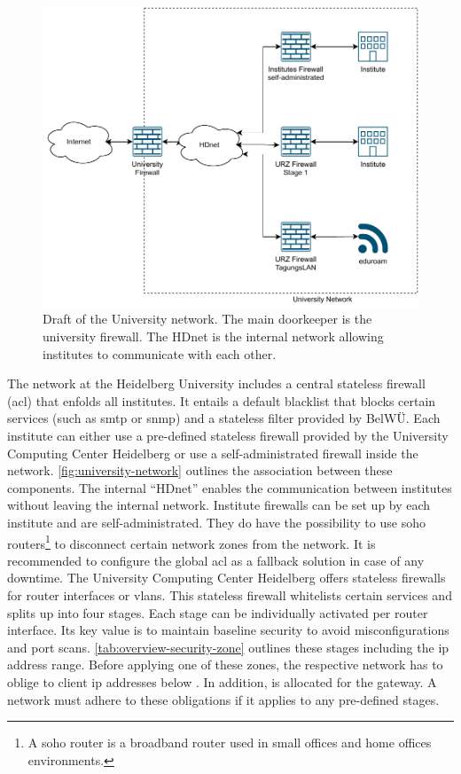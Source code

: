 \begin{figure}[htbp]
    \centering
    \includegraphics[width=\textwidth]{figures/university-network.pdf}
    \caption[Draft of the University network]{
        Draft of the University network.
        The main doorkeeper is the university firewall.
        The HDnet is the internal network allowing institutes to communicate with each other.
    }
    \label{fig:university-network}
\end{figure}

The network at the Heidelberg University includes a central stateless firewall (\ac{acl}) that enfolds all institutes.
It entails a default blacklist that blocks certain services (such as \ac{smtp} or \ac{snmp}) and a stateless filter provided by BelWÜ.
Each institute can either use a pre-defined stateless firewall provided by the University Computing Center Heidelberg or use a self-administrated firewall inside the network.
\autoref{fig:university-network} outlines the association between these components.
The internal \enquote{HDnet} enables the communication between institutes without leaving the internal network.
Institute firewalls can be set up by each institute and are self-administrated.
They do have the possibility to use \acs{soho} routers\footnote{A \acl{soho} router is a broadband router used in small offices and home offices environments.} to disconnect certain network zones from the network.
It is recommended to configure the global \ac{acl} as a fallback solution in case of any downtime.
The University Computing Center Heidelberg offers stateless firewalls for router interfaces or \acp{vlan}.
This stateless firewall whitelists certain services and splits up into four stages.
Each stage can be individually activated per router interface.
Its key value is to maintain baseline security to avoid misconfigurations and port scans.
\autoref{tab:overview-security-zone} outlines these stages including the \ac{ip} address range.
Before applying one of these zones, the respective network has to oblige to client \ac{ip} addresses below .
In addition,  is allocated for the gateway.
A network must adhere to these obligations if it applies to any pre-defined stages.

